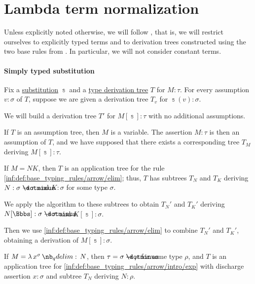 \section{Lambda term normalization}\label{sec:lambda_term_normalization}

Unless explicitly noted otherwise, we will follow , that is, we will restrict ourselves to explicitly typed terms and to derivation trees constructed using the two base rules from . In particular, we will not consider constant terms.

\paragraph{Simply typed substitution}

\begin{algorithm}\label{alg:simply_typed_substitution}
  Fix a \hyperref[def:lambda_substitution]{substitution} \( \Bbbs \) and a \hyperref[def:type_derivation_tree]{type derivation tree} \( T \) for \( M: \tau \). For every assumption \( v: \sigma \) of \( T \), suppose we are given a derivation tree \( T_v \) for \( \Bbbs(v): \sigma \).

  We will build a derivation tree \( T' \) for \( M[\Bbbs]: \tau \) with no additional assumptions.

  \begin{thmenum}
     If \( T \) is an assumption tree, then \( M \) is a variable. The assertion \( M: \tau \) is then an assumption of \( T \), and we have supposed that there exists a corresponding tree \( T_M \) deriving \( M[\Bbbs]: \tau \).

     If \( M = NK \), then \( T \) is an application tree for the rule \ref{inf:def:base_typing_rules/arrow/elim}; thus, \( T \) has subtrees \( T_N \) and \( T_K \) deriving \( N: \sigma \synimplies \tau \) and \( K: \sigma \) for some type \( \sigma \).

    We apply the algorithm to these subtrees to obtain \( T_N' \) and \( T_K' \) deriving \( N[\Bbbs]: \sigma \synimplies \tau \) and \( K[\Bbbs]: \sigma \).

    Then we use \ref{inf:def:base_typing_rules/arrow/elim} to combine \( T_N' \) and \( T_K' \), obtaining a derivation of \( M[\Bbbs]: \sigma \).

     If \( M = \qabs {x^\sigma} N \), then \( \tau = \sigma \synimplies \rho \) for some type \( \rho \), and \( T \) is an application tree for \ref{inf:def:base_typing_rules/arrow/intro/exp} with discharge assertion \( x: \sigma \) and subtree \( T_N \) deriving \( N: \rho \).


\end{thmenum}
\end{algorithm}
